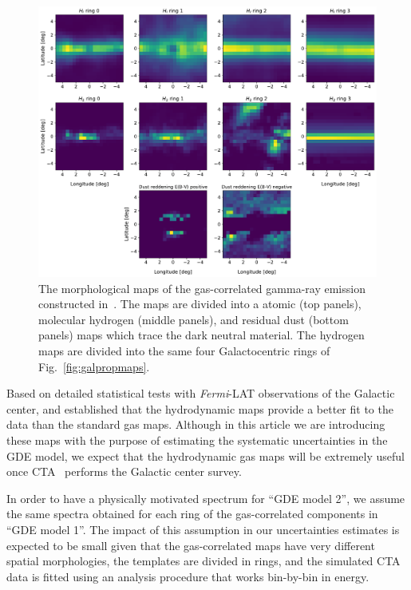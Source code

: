\documentclass[doublespace,nopageskip]{VTthesis} %
\begin{document}
\begin{figure}[htb!]
    \centering
    \includegraphics[width=\textwidth]{Figures/CTA/maps_mis.pdf}
    \caption{The morphological maps of the gas-correlated gamma-ray emission constructed in~\citet{Macias:2016nev}. The maps are divided into a atomic (top panels), molecular hydrogen (middle panels), and residual dust (bottom panels) maps which trace the dark neutral material. The hydrogen maps are divided into the same four Galactocentric rings of Fig.~\ref{fig:galpropmaps}.}
    \label{fig:hydro_maps}
\end{figure}

Based on detailed statistical tests with \textit{Fermi}-LAT observations of the Galactic center, \cite{Macias:2016nev,Macias:2019omb} and \cite{Buschmann:2020adf} established that the hydrodynamic maps provide a better fit to the data than the standard gas maps. Although in this article we are introducing these  maps with the purpose of estimating the systematic uncertainties in the GDE model, we expect that the hydrodynamic gas maps will be extremely useful once CTA~\citep{Acharyya:2020sbj} performs the Galactic center survey.  

In order to have a physically motivated spectrum for ``GDE model 2'', we assume the same spectra obtained for each ring of the gas-correlated components in ``GDE model 1''. The impact of this assumption in our uncertainties estimates is expected to be small given that the gas-correlated maps have very different spatial morphologies, the templates are divided in rings, and the simulated CTA data is fitted using an analysis procedure that works bin-by-bin in energy. 
\end{document}
